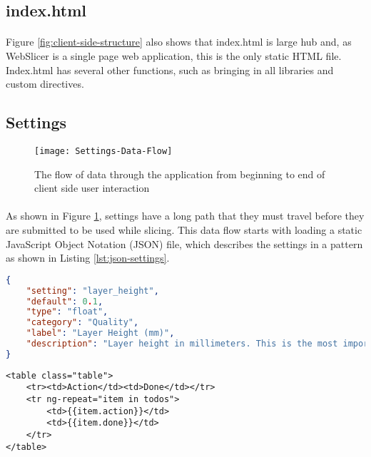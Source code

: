 \subsection{index.html}%
\paragraph{}
Figure \ref{fig:client-side-structure} also shows that index.html is large hub and, as WebSlicer is a single page web application, this is the only static HTML file.
Index.html has several other functions, such as bringing in all libraries and custom directives.

\subsection{Settings}%
\begin{figure}[!ht]
  \centering
  \texttt{[image: Settings-Data-Flow]}
  \caption{The flow of data through the application from beginning to end of client side user interaction}
  \label{fig:settings-data-flow}
\end{figure}
\paragraph{}
As shown in Figure \ref{fig:settings-data-flow}, settings have a long path that they must travel before they are submitted to be used while slicing. 
This data flow starts with loading a static JavaScript Object Notation (JSON) file, which describes the settings in a pattern as shown in Listing \ref{lst:json-settings}.

\begin{lstlisting}[language=json, style=thesiscode , label={lst:json-settings}, caption=A sample from a static settings file in JSON format.]
{
    "setting": "layer_height",
    "default": 0.1,
    "type": "float",
    "category": "Quality",
    "label": "Layer Height (mm)",
    "description": "Layer height in millimeters. This is the most important setting to determine the quality of your print. Normal quality prints are 0.1mm, high quality is 0.06mm. You can go up to 0.25mm."
}
\end{lstlisting}

\begin{lstlisting}[language=HTML5, style=thesiscode, label={lst:html-repeat-example}, caption=An example of a ng-repeat looping construct in HTML5.]
<table class="table">
	<tr><td>Action</td><td>Done</td></tr>
	<tr ng-repeat="item in todos">
		<td>{{item.action}}</td>
		<td>{{item.done}}</td>
	</tr>
</table>
\end{lstlisting}

